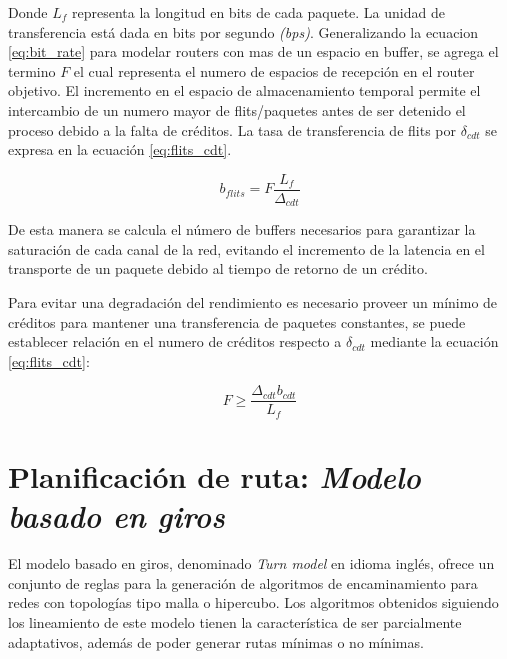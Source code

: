 Donde $L_f$ representa la longitud en bits de cada paquete. La unidad de transferencia está dada en bits por segundo \textit{(bps)}. Generalizando la ecuacion \ref{eq:bit_rate} para modelar routers con mas de un espacio en buffer, se agrega el termino $F$ el cual representa el numero de espacios de recepción en el router objetivo. El incremento en el espacio de almacenamiento temporal permite el intercambio de un numero mayor de flits/paquetes antes de ser detenido el proceso debido a la falta de créditos. La tasa de transferencia de flits por $\delta_{cdt}$ se expresa en la ecuación \ref{eq:flits_cdt}.

\begin{equation}
	b_{flits} = F\frac{L_f}{\Delta_{cdt}}
	\label{eq:flits_cdt}
\end{equation}

De esta manera se calcula el número de buffers necesarios para garantizar la saturación de cada canal de la red, evitando el incremento de la latencia en el transporte de un paquete debido al tiempo de retorno de un crédito.

Para evitar una degradación del rendimiento es necesario proveer un mínimo de créditos para mantener una transferencia de paquetes constantes, se puede establecer relación en el numero de créditos respecto a $\delta_{cdt}$ mediante la ecuación \ref{eq:flits_cdt}:

\begin{equation}
	F \geq \frac{\Delta_{cdt}b_{cdt}}{L_{f}}
	\label{eq:flits_cdt}
\end{equation}


\section{Planificación de ruta: \textit{Modelo basado en giros}}

El modelo basado en giros\cite{chapter2:Glass:1998:TMA:285930.286003}, denominado  \textit{Turn model} en idioma inglés, ofrece un conjunto de reglas para la generación de algoritmos de encaminamiento para redes con topologías tipo malla o hipercubo. Los algoritmos obtenidos siguiendo los lineamiento de este modelo tienen la característica de ser parcialmente adaptativos, además de poder generar rutas mínimas o no mínimas.

